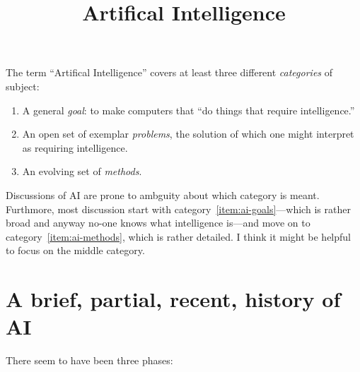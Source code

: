 \documentclass[10pt, a4paper, twocolumn]{article}
\title{Artifical Intelligence}
\begin{document}
\maketitle

The term ``Artifical Intelligence'' covers at least three different
\emph{categories} of subject:
\begin{enumerate}
\item\label{item:ai-goals} A general \emph{goal}: to make computers that ``do
  things that require intelligence.''
\item\label{item:ai-problems} An open set of exemplar \emph{problems}, the
  solution of which one might interpret as requiring intelligence.
\item\label{item:ai-methods} An evolving set of \emph{methods}.
\end{enumerate}

Discussions of AI are prone to ambguity about which category is
meant. Furthmore, most discussion start with category~\ref{item:ai-goals}---which
is rather broad and anyway no-one knows what intelligence is---and move on to
category~\ref{item:ai-methods}, which is rather detailed. I think it might be
helpful to focus on the middle category.

\section{A brief, partial, recent, history of AI}

There seem to have been three phases:
\end{document}
